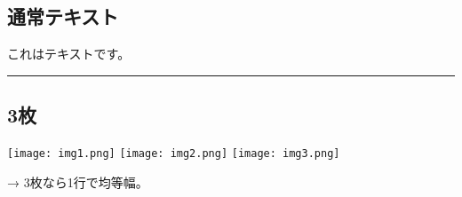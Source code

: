 \documentclass[
]{article}
\begin{document}
\subsection{通常テキスト}\label{ux901aux5e38ux30c6ux30adux30b9ux30c8}

これはテキストです。

\begin{center}\rule{0.5\linewidth}{0.5pt}\end{center}

\subsection{3枚}\label{ux679a}

\begin{center}
\texttt{[image: img1.png]}
\texttt{[image: img2.png]}
\texttt{[image: img3.png]}
\end{center}

→ 3枚なら1行で均等幅。
\end{document}
